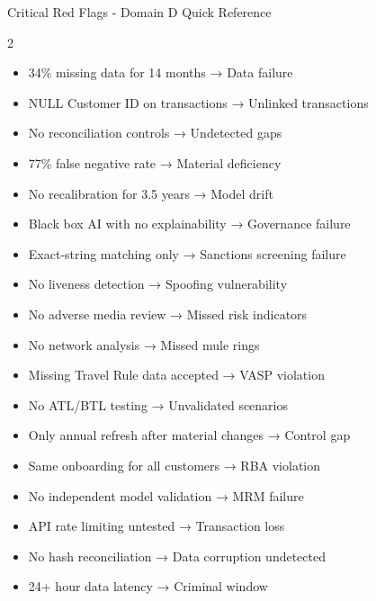 \documentclass[11pt,a4paper]{beamer}
\begin{document}
\begin{frame}{Critical Red Flags - Domain D Quick Reference}
	\begin{multicols}{2}
		\begin{itemize}
			\item 34\% missing data for 14 months → Data failure
			\item NULL Customer ID on transactions → Unlinked transactions
			\item No reconciliation controls → Undetected gaps
			\item 77\% false negative rate → Material deficiency
			\item No recalibration for 3.5 years → Model drift
			\item Black box AI with no explainability → Governance failure
			\item Exact-string matching only → Sanctions screening failure
			\item No liveness detection → Spoofing vulnerability
			\item No adverse media review → Missed risk indicators
			\item No network analysis → Missed mule rings
			\item Missing Travel Rule data accepted → VASP violation
			\item No ATL/BTL testing → Unvalidated scenarios
			\item Only annual refresh after material changes → Control gap
			\item Same onboarding for all customers → RBA violation
			\item No independent model validation → MRM failure
			\item API rate limiting untested → Transaction loss
			\item No hash reconciliation → Data corruption undetected
			\item 24+ hour data latency → Criminal window
		\end{itemize}
	\end{multicols}
\end{frame}
\end{document}
